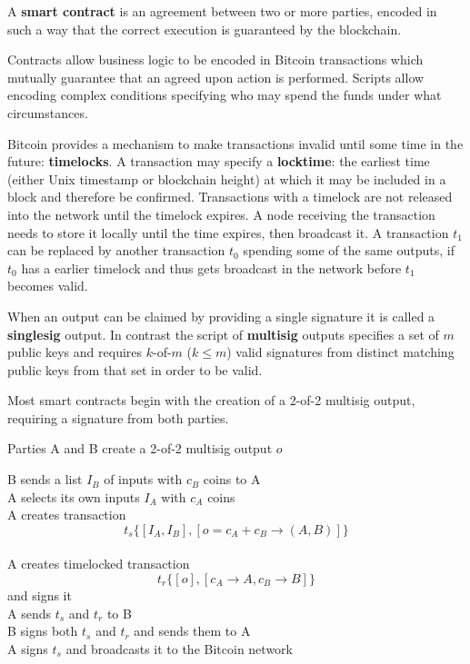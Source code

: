 A \textbf{smart contract} is an agreement between two or more parties, encoded in such a way that the correct execution is guaranteed by the blockchain. \medskip

Contracts allow business logic to be encoded in Bitcoin transactions which mutually guarantee that an agreed upon action is performed. Scripts allow encoding complex conditions specifying who may spend the funds under what circumstances. \medskip

Bitcoin provides a mechanism to make transactions invalid until some time in the future: \textbf{timelocks}. A transaction may specify a \textbf{locktime}: the earliest time (either Unix timestamp or blockchain height) at which it may be included in a block and therefore be confirmed. Transactions with a timelock are not released into the network until the timelock expires. A node receiving the transaction needs to store it locally until the time expires, then broadcast it. A transaction $t_1$ can be replaced by another transaction $t_0$ spending some of the same outputs, if $t_0$ has a earlier timelock and thus gets broadcast in the network before $t_1$ becomes valid.\medskip

When an output can be claimed by providing a single signature it is called a \textbf{singlesig} output. In contrast the script of \textbf{multisig} outputs specifies a set of $m$ public keys and requires $k$-of-$m$ ($k \leq m$) valid signatures from distinct matching public keys from that set in order to be valid. \medskip

Most smart contracts begin with the creation of a 2-of-2 multisig output, requiring a signature from both parties.\medskip

\begin{algorithm}[H]
\caption{Parties A and B create a 2-of-2 multisig output $o$}
	B sends a list $I_B$ of inputs with $c_B$ coins to A\\
	A selects its own inputs $I_A$ with $c_A$ coins\\
	A creates transaction $$t_s \{[I_A,I_B],[o=c_A+c_B \to (A,B)]\}$$\\
	A creates timelocked transaction $$t_r \{[o],[c_A \to A, c_B \to B]\}$$ and signs it\\
	A sends $t_s$ and $t_r$ to B\\
	B signs both $t_s$ and $t_r$ and sends them to A\\
	A signs $t_s$ and broadcasts it to the Bitcoin network
\end{algorithm}
\medskip

